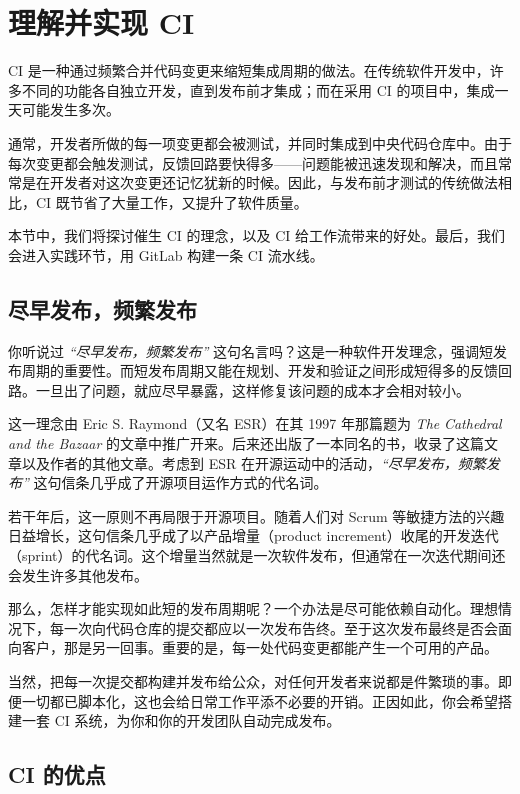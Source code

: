 \section{理解并实现 CI}

\label{idx:895}
\label{idx:896}
CI 是一种通过频繁合并代码变更来缩短集成周期的做法。在传统软件开发中，许多不同的功能各自独立开发，直到发布前才集成；而在采用 CI 的项目中，集成一天可能发生多次。

通常，开发者所做的每一项变更都会被测试，并同时集成到中央代码仓库中。由于每次变更都会触发测试，反馈回路要快得多——问题能被迅速发现和解决，而且常常是在开发者对这次变更还记忆犹新的时候。因此，与发布前才测试的传统做法相比，CI 既节省了大量工作，又提升了软件质量。

本节中，我们将探讨催生 CI 的理念，以及 CI 给工作流带来的好处。最后，我们会进入实践环节，用 GitLab 构建一条 CI 流水线。

\subsection{尽早发布，频繁发布}

\label{idx:897}
你听说过 \emph{“尽早发布，频繁发布”} 这句名言吗？这是一种软件开发理念，强调短发布周期的重要性。而短发布周期又能在规划、开发和验证之间形成短得多的反馈回路。一旦出了问题，就应尽早暴露，这样修复该问题的成本才会相对较小。

这一理念由 Eric S. Raymond（又名 ESR）在其 1997 年那篇题为 \emph{The} \emph{Cathedral and the Bazaar} 的文章中推广开来。后来还出版了一本同名的书，收录了这篇文章以及作者的其他文章。考虑到 ESR 在开源运动中的活动，\emph{“尽早发布，频繁发布”} 这句信条几乎成了开源项目运作方式的代名词。

\label{idx:898}
若干年后，这一原则不再局限于开源项目。随着人们对 Scrum 等敏捷方法的兴趣日益增长，这句信条几乎成了以产品增量（product increment）收尾的开发迭代（sprint）的代名词。这个增量当然就是一次软件发布，但通常在一次迭代期间还会发生许多其他发布。

那么，怎样才能实现如此短的发布周期呢？一个办法是尽可能依赖自动化。理想情况下，每一次向代码仓库的提交都应以一次发布告终。至于这次发布最终是否会面向客户，那是另一回事。重要的是，每一处代码变更都能产生一个可用的产品。

当然，把每一次提交都构建并发布给公众，对任何开发者来说都是件繁琐的事。即便一切都已脚本化，这也会给日常工作平添不必要的开销。正因如此，你会希望搭建一套 CI 系统，为你和你的开发团队自动完成发布。

\subsection{CI 的优点}

